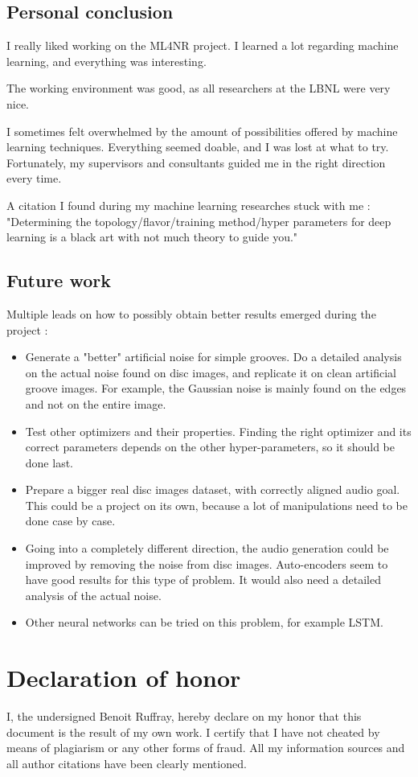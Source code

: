 \documentclass[12pt, twoside]{article}
\begin{document}
\subsection{Personal conclusion}
I really liked working on the ML4NR project. I learned a lot regarding machine learning, and everything was interesting.

The working environment was good, as all researchers at the LBNL were very nice.

I sometimes felt overwhelmed by the amount of possibilities offered by machine learning techniques. Everything seemed doable, and I was lost at what to try. Fortunately, my supervisors and consultants guided me in the right direction every time.

A citation I found during my machine learning researches stuck with me : "Determining the topology/flavor/training method/hyper parameters for deep learning is a black art with not much theory to guide you."\cite{transfer2} 
\subsection{Future work}
Multiple leads on how to possibly obtain better results emerged during the project :
\begin{itemize}
	\item Generate a "better" artificial noise for simple grooves. Do a detailed analysis on the actual noise found on disc images, and replicate it on clean artificial groove images. For example, the Gaussian noise is mainly found on the edges and not on the entire image.
	\item Test other optimizers and their properties. Finding the right optimizer and its correct parameters depends on the other hyper-parameters, so it should be done last.
	\item Prepare a bigger real disc images dataset, with correctly aligned audio goal. This could be a project on its own, because a lot of manipulations need to be done case by case.
	\item Going into a completely different direction, the audio generation could be improved by removing the noise from disc images. Auto-encoders seem to have good results for this type of problem. It would also need a detailed analysis of the actual noise.
	\item Other neural networks can be tried on this problem, for example LSTM.
\end{itemize}

\section{Declaration of honor}
I, the undersigned Benoit Ruffray, hereby declare on my honor that this document is the result of my own work.
I certify that I have not cheated by means of plagiarism or any other forms of fraud.
All my information sources and all author citations have been clearly mentioned.


\end{document}
